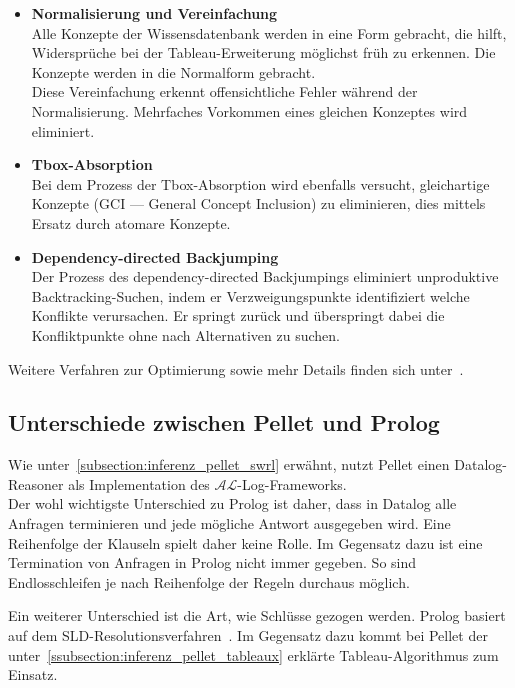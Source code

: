 \begin{itemize}
    \item \textbf{Normalisierung und Vereinfachung}\\
        Alle Konzepte der Wissensdatenbank werden in eine Form gebracht, die hilft, Widersprüche bei der Tableau-Erweiterung möglichst früh zu erkennen. Die Konzepte werden in die Normalform gebracht.\\
        Diese Vereinfachung erkennt offensichtliche Fehler während der Normalisierung. Mehrfaches Vorkommen eines gleichen Konzeptes wird eliminiert.

    \item \textbf{Tbox-Absorption}\\
        Bei dem Prozess der Tbox-Absorption wird ebenfalls versucht, gleichartige Konzepte (GCI --- General Concept Inclusion) zu eliminieren, dies mittels Ersatz durch atomare Konzepte.

    \item \textbf{Dependency-directed Backjumping}\\
        Der Prozess des dependency-directed Backjumpings eliminiert unproduktive Backtracking-Suchen, indem er Verzweigungspunkte identifiziert welche Konflikte verursachen. Er springt zurück und überspringt dabei die Konfliktpunkte ohne nach Alternativen zu suchen.
\end{itemize}

Weitere Verfahren zur Optimierung sowie mehr Details finden sich unter~\cite[S. 17 - 19]{sirin:pellet05}.

\subsection{Unterschiede zwischen Pellet und Prolog}
\label{subsec:inferenz_pellet_prolog}
Wie unter~\ref{subsection:inferenz_pellet_swrl} erwähnt, nutzt Pellet einen Datalog-Reasoner als Implementation des $\mathcal{AL}$-Log-Frameworks.\\
Der wohl wichtigste Unterschied zu Prolog ist daher, dass in Datalog alle Anfragen terminieren und jede mögliche Antwort ausgegeben wird. Eine Reihenfolge der Klauseln spielt daher keine Rolle. Im Gegensatz dazu ist eine Termination von Anfragen in Prolog nicht immer gegeben. So sind Endlosschleifen je nach Reihenfolge der Regeln durchaus möglich.~\cite[S. 175]{laemmel}

Ein weiterer Unterschied ist die Art, wie Schlüsse gezogen werden. Prolog basiert auf dem SLD-Resolutionsverfahren~\citep[Details siehe][S. 68]{laemmel}. Im Gegensatz dazu kommt bei Pellet der unter~\ref{ssubsection:inferenz_pellet_tableaux} erklärte Tableau-Algorithmus zum Einsatz.

